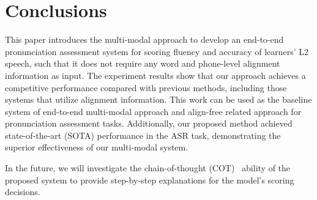 \section{Conclusions}
This paper introduces the multi-modal approach to develop an end-to-end pronunciation assessment system for scoring fluency and accuracy of learners' L2 speech, such that it does not require any word and phone-level alignment information as input. The experiment results show that our approach achieves a competitive performance compared with previous methods, including those systems that utilize alignment information. This work can be used as the baseline system of end-to-end multi-modal approach and align-free related approach for pronunciation assessment tasks. Additionally, our proposed method achieved state-of-the-art (SOTA) performance in the ASR task, demonstrating the superior effectiveness of our multi-modal system. 

In the future, we will investigate the chain-of-thought (COT)~\cite{cot} ability of the proposed system to provide step-by-step explanations for the model's scoring decisions.